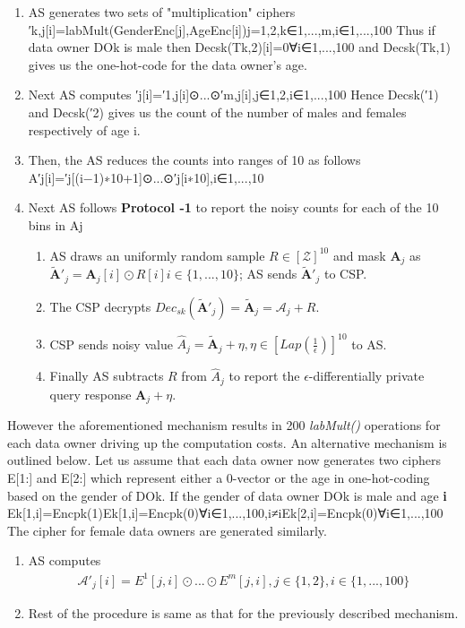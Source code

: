 \begin{enumerate}\item AS generates two sets of "multiplication" ciphers 
′k,j[i]=labMult(GenderEnc[j],AgeEnc[i])j={1,2},k∈{1,...,m},i∈{1,...,100}
 Thus if data owner DOk is male then Decsk(Tk,2)[i]=0∀i∈{1,...,100} and Decsk(Tk,1) gives us the one-hot-code for the data owner's age. \item Next AS computes 
′j[i]=′1,j[i]⊙...⊙′m,j[i],j∈{1,2},i∈{1,...,100}
Hence Decsk(′1) and Decsk(′2)  gives us the count of the number of males and females respectively of age i. \item Then, the AS reduces the counts into ranges of 10 as follows
A′j[i]=′j[(i−1)∗10+1]⊙...⊙′j[i∗10],i∈{1,...,10}
\item Next AS follows \textbf{Protocol -1} to report the noisy counts for each of the 10 bins in Aj
\begin{enumerate}\item AS draws an uniformly random sample $R \in [\mathcal{Z}]^{10}$ and mask $\textbf{A}_j$ as $\mathbf{\tilde{A}}'_j=\textbf{A}_j[i]\odot R[i] i \in \{1,...,10\}$; AS sends $\mathbf{\tilde{A}}'_j$ to CSP.  \item The CSP decrypts $Dec_{sk}(\mathbf{\tilde{A}}'_j)=\mathbf{\tilde{A}}_j=\mathcal{A}_j+R$.  \item CSP sends noisy value $\hat{A}_j=\mathbf{\tilde{A}}_j+\eta, \eta \in [Lap(\frac{1}{\epsilon})]^{10}$ to AS.  \item Finally AS subtracts $R$ from $\hat{A}_j$ to report the $\epsilon$-differentially private query response $\textbf{A}_j+\eta$. \end{enumerate}
\end{enumerate} However the aforementioned mechanism results in 200 \textit{ labMult()} operations for each data owner driving up the computation costs. An alternative mechanism is outlined below.  Let us assume that each data owner now generates two ciphers E[1:] and E[2:] which represent either a 0-vector or the age in one-hot-coding based on the gender of DOk. If the gender of data owner DOk is male and age \textbf{i} 
Ek[1,i]=Encpk(1)Ek[1,i]=Encpk(0)∀i∈{1,...,100},i≠iEk[2,i]=Encpk(0)∀i∈{1,...,100}
 The cipher for female data owners are generated similarly. 
\begin{enumerate}\item AS computes \begin{gather}\mathcal{A}'_j[i]=E^1[j,i]\odot ...\odot E^m[j,i], j \in \{1,2\}, i \in \{1,...,100\}\end{gather} \item Rest of the procedure is same as that for the previously described mechanism. \end{enumerate}
